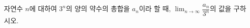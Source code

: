 자연수 $n$에 대하여 $3^n$의 양의 약수의 총합을 $a_n$이라 할 때, $\displaystyle\lim_{n\to\infty}\dfrac{a_n}{3^n}$의 값을 구하시오.
